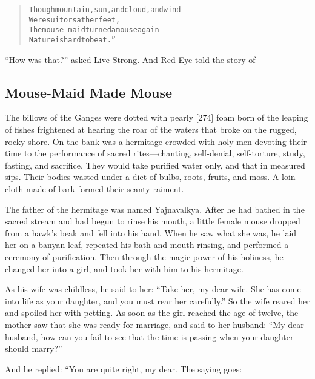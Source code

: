 \documentclass[article, twoside, 14pt]{memoir}
\renewenvironment{verbatim}{%
\begin{quote}%
\vskip -10pt%
\begin{alltt}\normalfont\large}{\end{alltt}%
\end{quote}%
\vskip -10pt
} %
\begin{document}
\begin{verbatim}
Though mountain, sun, and cloud, and wind
    Were suitors at her feet,
The mouse-maid turned a mouse again--
    Nature is hard to beat.”
\end{verbatim}
``How was that?'' asked Live-Strong. And Red-Eye told the story of

\subsection{Mouse-Maid Made Mouse}

\label{s60}

The billows of the Ganges were dotted with pearly [274] foam born
of the leaping of fishes frightened at hearing the roar of the
waters that broke on the rugged, rocky shore. On the bank was a
hermitage crowded with holy men devoting their time to the
performance of sacred rites---chanting, self-denial, self-torture,
study, fasting, and sacrifice. They would take purified water only,
and that in measured sips. Their bodies wasted under a diet of
bulbs, roots, fruits, and moss. A loin-cloth made of bark formed
their scanty raiment.

The father of the hermitage was named Yajnavalkya. After he had
bathed in the sacred stream and had begun to rinse his mouth, a
little female mouse dropped from a hawk's beak and fell into his
hand. When he saw what she was, he laid her on a banyan leaf,
repeated his bath and mouth-rinsing, and performed a ceremony of
purification. Then through the magic power of his holiness, he
changed her into a girl, and took her with him to his hermitage.

As his wife was childless, he said to her:
``Take her, my dear wife. She has come into life as your daughter, and you must rear her carefully.''
So the wife reared her and spoiled her with petting. As soon as the
girl reached the age of twelve, the mother saw that she was ready
for marriage, and said to her husband:
``My dear husband, how can you fail to see that the time is passing when your daughter should marry?''

And he replied: “You are quite right, my dear. The saying goes:
\end{document}
